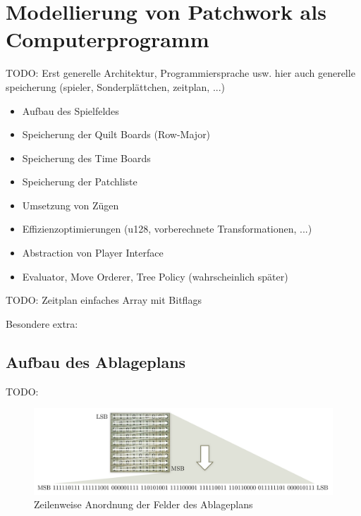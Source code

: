 \chapter{Modellierung von Patchwork als Computerprogramm}
\label{chapter:modellierung-von-patchwork-als-computerprogramm}

TODO: Erst generelle Architektur, Programmiersprache usw. hier auch generelle speicherung (spieler, Sonderplättchen, zeitplan, ...)

\begin{itemize}
    \item Aufbau des Spielfeldes
    \item Speicherung der Quilt Boards (Row-Major)
    \item Speicherung des Time Boards
    \item Speicherung der Patchliste
    \item Umsetzung von Zügen
    \item Effizienzoptimierungen (u128, vorberechnete Transformationen, ...)
    \item Abstraction von Player Interface
    \item Evaluator, Move Orderer, Tree Policy (wahrscheinlich später)
\end{itemize}

TODO: Zeitplan einfaches Array mit Bitflags

Besondere extra:

\section{Aufbau des Ablageplans}

TODO:

\begin{figure}[!ht]
    \centering
     \vspace*{-\baselineskip}
    \includegraphics[width=\textwidth]{res/pictures/quilt-board-storage.pdf}
    \caption{Zeilenweise Anordnung der Felder des Ablageplans}
    \label{fig:quilt-board-storage}
\end{figure}

